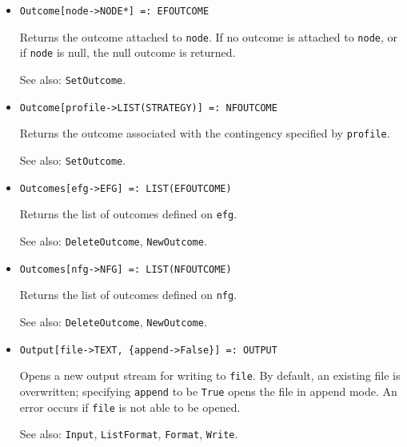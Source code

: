 \begin{itemize}
\item{}
\protect \large \begin{verbatim}
Outcome[node->NODE*] =: EFOUTCOME 
\end{verbatim}\normalsize

\bd
Returns the outcome attached to \verb+node+.  If no outcome is attached
to \verb+node+, or if \verb+node+ is null, the null outcome is returned.
\item [See also:] \verb+SetOutcome+.
\ed

\item{}
\protect \large \begin{verbatim}
Outcome[profile->LIST(STRATEGY)] =: NFOUTCOME 
\end{verbatim}\normalsize

\bd
Returns the outcome associated with the contingency specified by
\verb+profile+.
\item [See also:] \verb+SetOutcome+.
\ed

\item{}
\protect \large \begin{verbatim}
Outcomes[efg->EFG] =: LIST(EFOUTCOME) 
\end{verbatim}\normalsize

\bd
Returns the list of outcomes defined on \verb+efg+.
\item [See also:] \verb+DeleteOutcome+, \verb+NewOutcome+.
\ed

\item{}
\protect \large \begin{verbatim}
Outcomes[nfg->NFG] =: LIST(NFOUTCOME) 
\end{verbatim}\normalsize

\bd
Returns the list of outcomes defined on \verb+nfg+.
\item [See also:] \verb+DeleteOutcome+, \verb+NewOutcome+.
\ed

\item{}
\protect \large \begin{verbatim}
Output[file->TEXT, {append->False}] =: OUTPUT 
\end{verbatim}\normalsize

\bd
Opens a new output stream for writing to \verb+file+.  By default,
an existing file is overwritten; specifying \verb+append+ to be \verb+True+
opens the file in append mode.  An error occurs if \verb+file+ is not
able to be opened.
\item [See also:] \verb+Input+, \verb+ListFormat+, \verb+Format+,
\verb+Write+.
\ed


\end{itemize}
